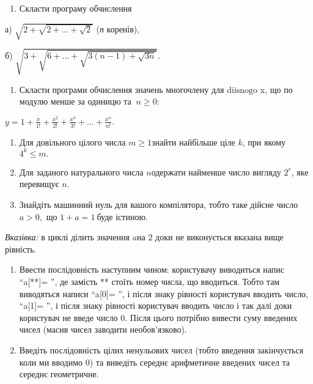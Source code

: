 \documentclass[]{article}
\begin{document}
\begin{enumerate}
\def\labelenumi{\arabic{enumi})}
\item
  Скласти програму обчислення
\end{enumerate}

а) \(\sqrt{2 + \sqrt{2 + \ldots + \sqrt{2}}}\) (\emph{п} коренів),

б) \(\sqrt{3 + \sqrt{6 + \ldots + \sqrt{3(n - 1) + \sqrt{3n}}}}.\)

\begin{enumerate}
\def\labelenumi{\arabic{enumi})}
\item
  Скласти програми обчислення значень многочлену для
  \(\mathrm{diisnogo}\) x, що по модулю менше за одиницю та
  \(\mathrm{\ }n \geq 0:\)
\end{enumerate}

\(y = 1 + \frac{x}{1!} + \frac{x^{2}}{2!} + \frac{x^{3}}{3!} + \ldots + \frac{x^{n}}{n!}.\mathrm{\ }\)

\begin{enumerate}
\def\labelenumi{\arabic{enumi})}
\item
  Для довільного цілого числа \(m \geq 1\)знайти найбільше ціле \(k\),
  при якому \(4^{k} \leq m.\)
\item
  Для заданого натурального числа \(n\)одержати найменше число вигляду
  \(2^{r}\), яке перевищує \(n\)\emph{.}
\item
  Знайдіть машинний нуль для вашого компілятора, тобто таке дійсне число
  \(a > 0,\) що \(1 + a = 1\ \)буде істиною.
\end{enumerate}

\emph{Вказівка:} в циклі ділить значення \(a\)на 2 доки не виконується
вказана вище рівність.

\begin{enumerate}
\def\labelenumi{\arabic{enumi})}
\item
  Ввести послідовність наступним чином: користувачу виводиться напис
  ``a{[}**{]}= '', де замість ** стоїть номер числа, що вводиться. Тобто
  там виводяться написи ``a{[}0{]}= '', і після знаку рівності
  користувач вводить число, ``a{[}1{]}= '', і після знаку рівності
  користувач вводить число і так далі доки користувач не введе число 0.
  Після цього потрібно вивести суму введених чисел (масив чисел заводити
  необов'язково).
\item
  Введіть послідовність цілих ненульових чисел (тобто введення
  закінчується коли ми вводимо 0) та виведіть середнє арифметичне
  введених чисел та середнє геометричне.
\end{enumerate}
\end{document}
